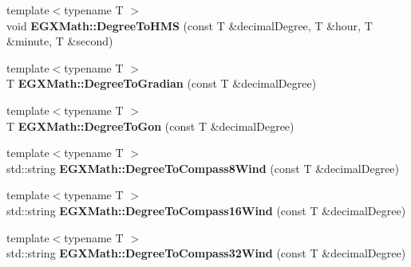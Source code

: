 \begin{DoxyCompactItemize}
\item 
\mbox{\label{group___e_g_x_math-_angle_conversions_ga0bb223ca6e77b00439a6d910ab32d82e}} 
{\footnotesize template$<$typename T $>$ }\\void {\bfseries E\+G\+X\+Math\+::\+Degree\+To\+H\+MS} (const T \&decimal\+Degree, T \&hour, T \&minute, T \&second)
\item 
\mbox{\label{group___e_g_x_math-_angle_conversions_ga25bb5506b3f66fff7a1b85bf7bd795b3}} 
{\footnotesize template$<$typename T $>$ }\\T {\bfseries E\+G\+X\+Math\+::\+Degree\+To\+Gradian} (const T \&decimal\+Degree)
\item 
\mbox{\label{group___e_g_x_math-_angle_conversions_ga87c3fab0867021e5d2501197b4db6194}} 
{\footnotesize template$<$typename T $>$ }\\T {\bfseries E\+G\+X\+Math\+::\+Degree\+To\+Gon} (const T \&decimal\+Degree)
\item 
\mbox{\label{group___e_g_x_math-_angle_conversions_ga2931d1a465a38eeac2bff28be7bd1cdc}} 
{\footnotesize template$<$typename T $>$ }\\std\+::string {\bfseries E\+G\+X\+Math\+::\+Degree\+To\+Compass8\+Wind} (const T \&decimal\+Degree)
\item 
\mbox{\label{group___e_g_x_math-_angle_conversions_gae18a97e6d8ca3cd39150ceeb70a7dd37}} 
{\footnotesize template$<$typename T $>$ }\\std\+::string {\bfseries E\+G\+X\+Math\+::\+Degree\+To\+Compass16\+Wind} (const T \&decimal\+Degree)
\item 
\mbox{\label{group___e_g_x_math-_angle_conversions_gae1d23b2ed99cb9c274ffcc350d6ff6ce}} 
{\footnotesize template$<$typename T $>$ }\\std\+::string {\bfseries E\+G\+X\+Math\+::\+Degree\+To\+Compass32\+Wind} (const T \&decimal\+Degree)
\item 
\mbox{\label{group___e_g_x_math-_angle_conversions_gaf7f66c4acc53575c51646ffe28159930}} 

\end{DoxyCompactItemize}
